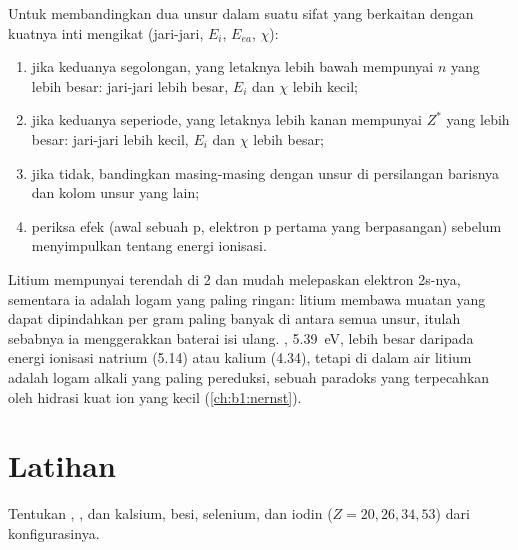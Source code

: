 \begin{method}\label{met:b1:periodicity:predict}
Untuk membandingkan dua unsur dalam suatu sifat yang berkaitan dengan
kuatnya inti mengikat  (jari-jari, $E_i$, $E_{ea}$,
$\chi$):
\begin{enumerate}
  \item jika keduanya segolongan, yang letaknya lebih bawah mempunyai $n$
        yang lebih besar: jari-jari lebih besar, $E_i$ dan $\chi$ lebih
        kecil;
  \item jika keduanya seperiode, yang letaknya lebih kanan mempunyai
        $Z^{*}$ yang lebih besar: jari-jari lebih kecil, $E_i$ dan $\chi$
        lebih besar;
  \item jika tidak, bandingkan masing-masing dengan unsur di persilangan
        barisnya dan kolom unsur yang lain;
  \item periksa efek  (awal sebuah  p, elektron p
        pertama yang berpasangan) sebelum menyimpulkan tentang energi
        ionisasi.
\end{enumerate}
\end{method}

\begin{example}\label{ex:b1:periodicity:lithium}
Litium mempunyai  terendah di  2 dan mudah
melepaskan elektron 2s-nya, sementara ia adalah logam yang paling ringan:
litium membawa muatan yang dapat dipindahkan per gram paling banyak di
antara semua unsur, itulah sebabnya ia menggerakkan baterai isi ulang.
, \qty{5.39}{eV}, lebih besar daripada energi
ionisasi natrium (5.14) atau kalium (4.34), tetapi di dalam air litium
adalah logam alkali yang paling pereduksi, sebuah paradoks yang
terpecahkan oleh hidrasi kuat ion  yang kecil
(\cref{ch:b1:nernst}).
\end{example}

\section{Latihan}

\begin{exercise}[$\star$]\label{exo:b1:periodicity:1}
Tentukan , , dan  kalsium, besi, selenium, dan iodin
($Z = 20, 26, 34, 53$) dari konfigurasinya.
\end{exercise}

